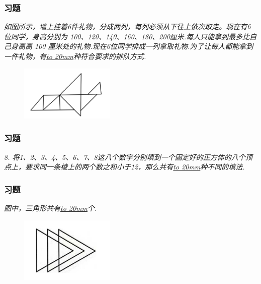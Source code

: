 \begin{frame}
    \frametitle{习题\theframecounter}
    \textit{如图所示，墙上挂着6件礼物，分成两列，每列必须从下往上依次取走。现在有6位同学，身高分别为 100、120、140、160、180、200厘米.每人只能拿到最多比自己身高高 100 厘米处的礼物.现在6位同学排成一列拿取礼物.为了让每人都能拿到一件礼物，有\underline{\hbox to 20mm{}}种符合要求的排队方式.}
    \begin{figure}[H] 
        \centering
        \includegraphics[width=0.4\textwidth]{./pics/Chapter_6/3.png}
    \end{figure}
\end{frame}


\begin{frame}
    \frametitle{习题\theframecounter}
    \textit{8.	将1、2、3、4、5、6、7、8这八个数字分别填到一个固定好的正方体的八个顶点上，要求同一条棱上的两个数之和小于12，那么共有\underline{\hbox to 20mm{}}种不同的填法.}
\end{frame}


\begin{frame}
    \frametitle{习题\theframecounter}
    \textit{图中，三角形共有\underline{\hbox to 20mm{}}个.}
    \begin{figure}[H] 
        \centering
        \includegraphics[width=0.4\textwidth]{./pics/Chapter_6/5.png}
    \end{figure}
\end{frame}

